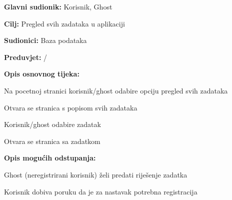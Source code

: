 						\noindent {}
					\begin{packed_item}
						
						\item \textbf{Glavni sudionik: }Korisnik, Ghost
						\item  \textbf{Cilj:} Pregled svih zadataka u aplikaciji
						\item  \textbf{Sudionici:} Baza podataka
						\item  \textbf{Preduvjet:} /
						\item  \textbf{Opis osnovnog tijeka:}
						
						\item[] \begin{packed_enum}
							
							\item Na pocetnoj stranici korisnik/ghost odabire opciju pregled svih zadataka
							\item Otvara se stranica s popisom svih zadataka
							\item Korisnik/ghost odabire zadatak
							\item Otvara se stranica sa zadatkom
						\end{packed_enum}
						
						\item  \textbf{Opis mogućih odstupanja:}
						
						\item[] \begin{packed_item}
							
							\item[4.a] Ghost (neregistrirani korisnik) želi predati riješenje zadatka 
							\item[] \begin{packed_enum}
								
								\item Korisnik dobiva poruku da je za nastavak potrebna registracija
								
							\end{packed_enum}
							
						\end{packed_item}
					\end{packed_item}
					
